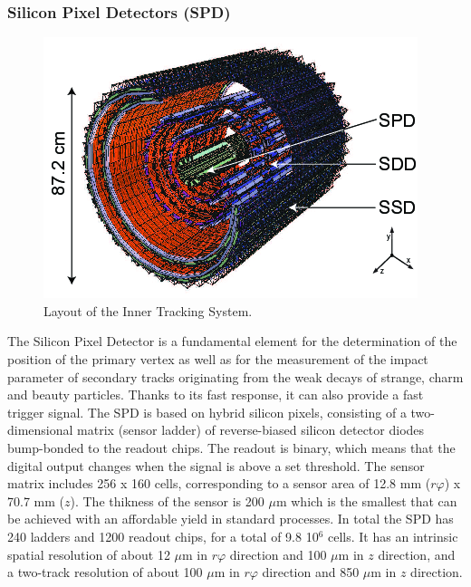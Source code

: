 \documentclass[b5paper,10pt,twoside,oldstyle,classica]{toptesi}
\begin{document}
\subsubsection{Silicon Pixel Detectors (SPD)}
\begin{figure}[tb]
\begin{center}
\includegraphics[scale = 0.5]{its.png}
\caption{Layout of the Inner Tracking System.}
\label{ITS}
\end{center}
\end{figure}
The Silicon Pixel Detector is a fundamental element for the determination of the position of the primary vertex as well as for the measurement of the impact parameter of secondary tracks originating from the weak decays of strange, charm and beauty particles. Thanks to its fast response, it can also provide a fast trigger signal.
The SPD is based on hybrid silicon pixels, consisting of a two-dimensional matrix (sensor ladder) of reverse-biased silicon detector diodes bump-bonded to the readout chips. The readout is binary, which means that the digital output changes when the signal is above a set threshold.
The sensor matrix includes 256 x 160 cells, corresponding to a sensor area of 12.8 mm ($r\varphi$) x 70.7 mm ($z$). 
The thikness of the sensor is 200 $\mu$m which is the smallest that can be achieved with an affordable yield in standard processes.
In total the SPD has 240 ladders and 1200 readout chips, for a total of 9.8 10$^6$ cells. It has an intrinsic spatial resolution of about 12 $\mu$m in $r\varphi$ direction and 100 $\mu$m in $z$ direction, and a two-track resolution of about 100 $\mu$m in $r\varphi$ direction and 850 $\mu$m in $z$ direction. 
\end{document}
